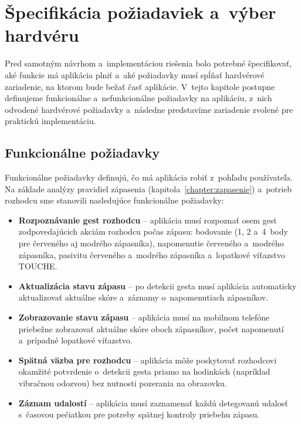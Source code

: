 \section{Špecifikácia požiadaviek a~výber hardvéru}

Pred samotným návrhom a~implementáciou riešenia bolo
potrebné špecifikovať, aké funkcie má aplikácia plniť
a~aké požiadavky musí spĺňať hardvérové zariadenie,
na ktorom bude bežať časť aplikácie. V~tejto kapitole
postupne definujeme funkcionálne a~nefunkcionálne
požiadavky na aplikáciu, z~nich odvodené hardvérové
požiadavky a~následne predstavíme zariadenie zvolené
pre praktickú implementáciu.

\subsection{Funkcionálne požiadavky}
\label{subsec:funkcionalne-poziadavky}

Funkcionálne požiadavky definujú, čo má aplikácia robiť
z~pohľadu používateľa. Na základe analýzy pravidiel
zápasenia (kapitola~\ref{chapter:zapasenie}) a~potrieb
rozhodcu sme stanovili nasledujúce funkcionálne
požiadavky:

\begin{itemize}
  \item \textbf{Rozpoznávanie gest rozhodcu} -- aplikácia
        musí rozpoznať osem gest zodpovedajúcich akciám
        rozhodcu počas zápasu: bodovanie (1, 2 a~4~body
        pre červeného aj modrého zápasníka), napomenutie
        červeného a~modrého zápasníka, pasivitu červeného
        a~modrého zápasníka a~lopatkové víťazstvo TOUCHE.

  \item \textbf{Aktualizácia stavu zápasu} -- po detekcii
        gesta musí aplikácia automaticky aktualizovať
        aktuálne skóre a~záznamy o~napomenutiach
        zápasníkov.

  \item \textbf{Zobrazovanie stavu zápasu} -- aplikácia
        musí na mobilnom telefóne priebežne zobrazovať
        aktuálne skóre oboch zápasníkov, počet
        napomenutí a~prípadné lopatkové víťazstvo.

  \item \textbf{Spätná väzba pre rozhodcu} -- aplikácia
        môže poskytovať rozhodcovi okamžité potvrdenie
        o~detekcii gesta priamo na hodinkách
        (napríklad vibračnou odozvou) bez nutnosti
        pozerania na obrazovku.

  \item \textbf{Záznam udalostí} -- aplikácia musí
        zaznamenať každú detegovanú udalosť s~časovou
        pečiatkou pre potreby spätnej kontroly priebehu
        zápasu.
\end{itemize}

